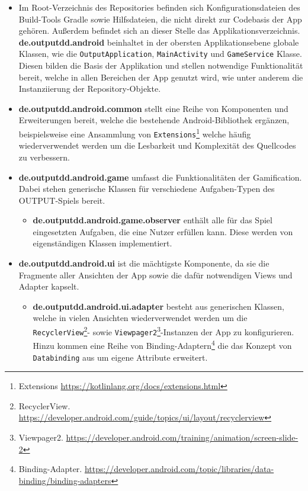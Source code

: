 \begin{itemize}
    \item Im Root-Verzeichnis des Repositories befinden sich Konfigurationsdateien des Build-Tools Gradle sowie Hilfsdateien, die nicht direkt zur Codebasis der App gehören. Außerdem befindet sich an dieser Stelle das Applikationsverzeichnis.
    \textbf{de.outputdd.android} beinhaltet in der obersten Applikationsebene globale Klassen, wie die \texttt{OutputApplication}, \texttt{MainActivity} und \texttt{GameService} Klasse. Diesen bilden die Basis der Applikation und stellen notwendige Funktionalität bereit, welche in allen Bereichen der App genutzt wird, wie unter anderem die Instanziierung der Repository-Objekte.
    \item \textbf{de.outputdd.android.common} stellt eine Reihe von Komponenten und Erweiterungen bereit, welche die bestehende Android-Bibliothek ergänzen, beispielsweise eine Ansammlung von \texttt{Extensions}\footnote{Extensions \url{https://kotlinlang.org/docs/extensions.html}} welche häufig wiederverwendet werden um die Lesbarkeit und Komplexität des Quellcodes zu verbessern.  
    \item \textbf{de.outputdd.android.game} umfasst die Funktionalitäten der Gamification. Dabei stehen generische Klassen für verschiedene Aufgaben-Typen des OUTPUT-Spiels bereit.
        \begin{itemize}
            \item \textbf{de.outputdd.android.game.observer} enthält alle für das Spiel eingesetzten Aufgaben, die eine Nutzer erfüllen kann. Diese werden von eigenständigen Klassen implementiert.
        \end{itemize} \newpage
    \item \textbf{de.outputdd.android.ui} ist die mächtigste Komponente, da sie die Fragmente aller Ansichten der App sowie die dafür notwendigen Views und Adapter kapselt. 
        \begin{itemize}
            \item \textbf{de.outputdd.android.ui.adapter} besteht aus generischen Klassen, welche in vielen Ansichten wiederverwendet werden um die \texttt{RecyclerView}\footnote{RecyclerView. \url{https://developer.android.com/guide/topics/ui/layout/recyclerview}}- sowie \texttt{Viewpager2}\footnote{Viewpager2. \url{https://developer.android.com/training/animation/screen-slide-2}}-Instanzen der App zu konfigurieren. Hinzu kommen eine Reihe von Binding-Adaptern\footnote{Binding-Adapter. \url{https://developer.android.com/topic/libraries/data-binding/binding-adapters}} die das Konzept von \texttt{Databinding} aus  um eigene Attribute erweitert.

\end{itemize}
\end{itemize}
